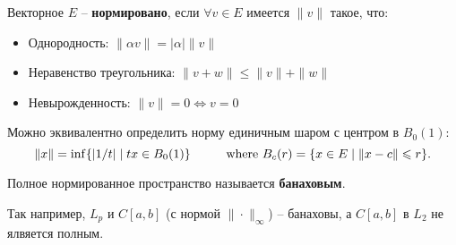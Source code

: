
\begin{to_def}
	Векторное $E$ -- \textbf{нормировано}, если $\forall v \in E$ имеется $\|v\|$ такое, что:
	\begin{itemize}
		\item Однородность: $\|\alpha v\| = |\alpha| \|v\|$
		\item Неравенство треугольника: $\|v + w\| \leq \|v\| + \|w\|$
		\item Невырожденность: $\|v\| = 0 \Leftrightarrow v = 0$
	\end{itemize}
\end{to_def}

Можно эквивалентно определить норму единичным шаром с центром в $B_0(1)$:
\begin{equation*}
	\|x\| = \inf \{|1/t| \mid t x \in B_0(1)\}
	\hspace{1 cm}
	\text{where }
	B_{c}(r) = \{x \in E \mid \|x-c\| \leq r\}.
\end{equation*}

\begin{to_def}
	Полное нормированное пространство называется \textbf{банаховым}.
\end{to_def}

Так например, $L_p$ и $C[a, b]$ (с нормой $\|\cdot\|_{\infty}$) -- банаховы, а $C[a, b]$ в $L_2$ не ялвяется полным. 



